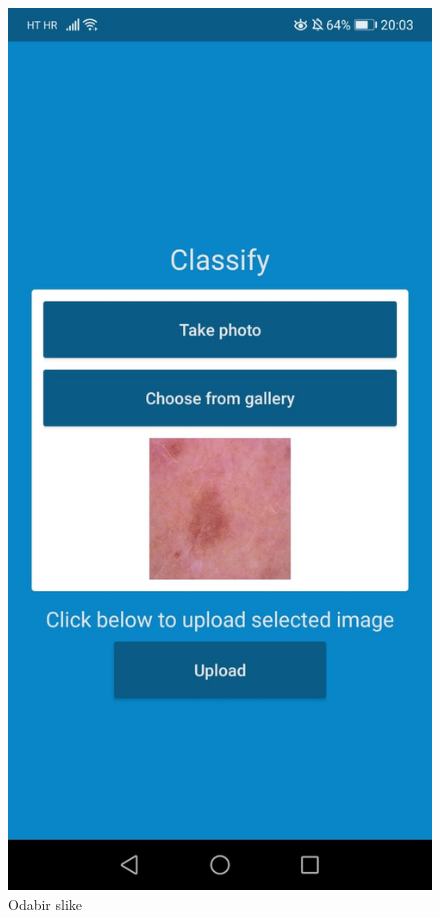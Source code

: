 \documentclass[times, utf8, zavrsni]{fer}
\begin{document}
\begin{figure}[!h]
  \includegraphics[width=1\textwidth]{./slike/app8}
	\caption{Odabir slike}
\label{fig:app8}
\endminipage\hfill
{}

\end{figure}
\end{document}
